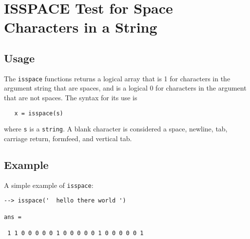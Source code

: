 \section{ISSPACE Test for Space Characters in a String}

\subsection{Usage}

The \verb|isspace| functions returns a logical array that is 1 
for characters in the argument string that are spaces, and 
is a logical 0 for characters in the argument that are not
spaces.  The syntax for its use is
\begin{verbatim}
   x = isspace(s)
\end{verbatim}
where \verb|s| is a \verb|string|.  A blank character is considered
a space, newline, tab, carriage return, formfeed, and vertical
tab.
\subsection{Example}

A simple example of \verb|isspace|:
\begin{verbatim}
--> isspace('  hello there world ')

ans = 

 1 1 0 0 0 0 0 1 0 0 0 0 0 1 0 0 0 0 0 1 
\end{verbatim}
